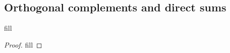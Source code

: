 \subsection{Orthogonal complements and direct sums}

\begin{exercise}{1}
fill
\end{exercise}
\begin{proof}
fill
\end{proof}